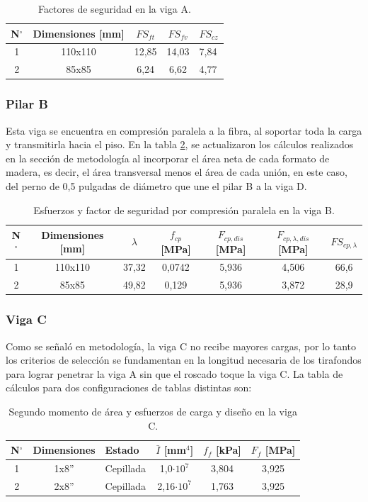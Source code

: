 \begin{table}[H]
\centering
\begin{tabular}{@{}ccccl@{}}
\toprule
N$^{\circ}$ & Dimensiones [mm] & $FS_{ft}$ & $FS_{fv}$ & $FS_{cz}$ \\ \midrule
1 & 110x110 & 12,85 & 14,03 & 7,84 \\
2 & 85x85 & 6,24 & 6,62 & 4,77 \\ \bottomrule
\end{tabular}
\caption{Factores de seguridad en la viga A.}
\label{tab:res_viga_a2}
\end{table}

\subsubsection{Pilar B}
Esta viga se encuentra en compresión paralela a la fibra, al soportar toda la carga y transmitirla hacia el piso. En la tabla \ref{tab:res_viga_b}, se actualizaron los cálculos realizados en la sección de metodología al incorporar el área neta de cada formato de madera, es decir, el área transversal menos el área de cada unión, en este caso, del perno de 0,5 pulgadas de diámetro que une el pilar B a la viga D.

\begin{table}[h]
\centering
\begin{tabular}{@{}ccccccc@{}}
\toprule
N$^{\circ}$ & Dimensiones [mm] & $\lambda$ & $f_{cp}$ [MPa] & $F_{cp,dis}$ [MPa] & $F_{cp,\lambda,dis}$ [MPa] & $FS_{cp,\lambda}$ \\ \midrule
1 & 110x110 & 37,32 & 0,0742 & 5,936 & 4,506 & 66,6 \\
2 & 85x85 & 49,82 & 0,129 & 5,936 & 3,872 & 28,9 \\ \bottomrule
\end{tabular}
\caption{Esfuerzos y factor de seguridad por compresión paralela en la viga B.}
\label{tab:res_viga_b}
\end{table}

\subsubsection{Viga C}
Como se señaló en metodología, la viga C no recibe mayores cargas, por lo tanto los criterios de selección se fundamentan en la longitud necesaria de los tirafondos para lograr penetrar la viga A sin que el roscado toque la viga C. La tabla de cálculos para dos configuraciones de tablas distintas son:

\begin{table}[h]
\centering
\begin{tabular}{@{}cclccc@{}}
\toprule
N$^{\circ}$ & Dimensiones & Estado & $\bar{I}$ [mm$^4$] & $f_f$ [kPa] & $F_f$ [MPa] \\ \midrule
1 & 1x8'' & Cepillada & 1,0$\cdot 10^7$ & 3,804 & 3,925 \\
2 & 2x8'' & Cepillada & 2,16$\cdot 10^7$ & 1,763 & 3,925 \\ \bottomrule
\end{tabular}
\caption{Segundo momento de área y esfuerzos de carga y diseño en la viga C.}
\label{tab:res_viga_c}
\end{table}

